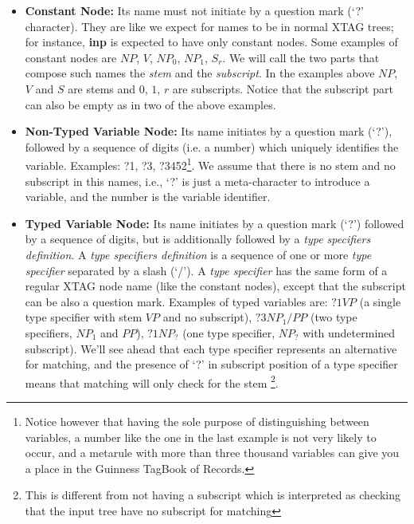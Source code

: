 \begin{itemize}

\item {\bf Constant Node:} Its name must not initiate by a question mark
        (`?' character). They are like we expect for names to be in normal
        XTAG trees; for instance, {\bf inp} is expected to have only constant
        nodes. Some examples of constant nodes are $NP$, $V$, $NP_0$, $NP_1$,
        $S_r$. We will call the two parts that compose such names
        the {\it stem} and the {\it subscript}.
        In the examples above  $NP$, $V$ and $S$ are stems and 
        $0$, $1$, $r$ are subscripts. Notice that the
        subscript part can also be empty as in two of the above examples.

\item {\bf Non-Typed Variable Node:} Its name initiates by a question 
        mark (`?'), followed by a sequence of digits (i.e. a number) which 
        uniquely identifies the variable. Examples: ?1, ?3, 
        ?3452\footnote{Notice
        however that having the sole purpose of distinguishing between 
        variables, a number like the one in the last example 
        is not very likely
        to occur, and a metarule with more than 
        three thousand variables can give
        you a place in the Guinness TagBook of Records.}. We assume that
        there is no stem and no subscript in this names, i.e., `?' is just
        a meta-character to introduce a variable, and the number is the 
        variable identifier. 

\item {\bf Typed Variable Node:} Its name initiates by a question mark (`?')
        followed by a sequence of digits, but is additionally followed by
        a {\it type specifiers definition}. A {\it type specifiers definition}
        is a sequence of one or more {\it type specifier} separated by a slash
        (`/'). A {\it type specifier} has the same form of a regular XTAG node
        name (like the constant nodes), except that the subscript can be also
        a question mark. Examples of typed variables are:
        $?1VP$ (a single type specifier with stem $VP$ and no subscript), 
        $?3NP_1/PP$ (two type specifiers, $NP_1$ and $PP$),
        $?1NP_?$ (one type specifier, $NP_?$ with undetermined subscript). 
        We'll see ahead that each type specifier represents an alternative
        for matching, and the presence of `?' in subscript position of a
        type specifier means that matching will only check for the stem
        \footnote{This is different from not having a subscript which is 
        interpreted as checking that the input tree have no subscript 
        for matching}.
\end{itemize}

